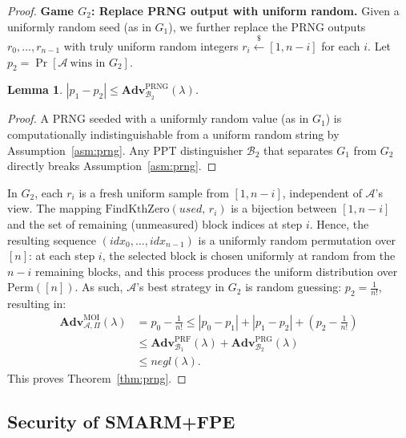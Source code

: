 \documentclass[journal]{IEEEtran}
\newcommand{\rtsmarmtwo}{SMARM+FPE\xspace}
\newtheorem{lemma}{Lemma}[section]
\newcommand{\Adv}{\mathbf{Adv}}
\begin{document}
\begin{proof}
\medskip
\noindent\textbf{Game $G_2$: Replace PRNG output with uniform random.}
Given a uniformly random seed (as in $G_1$), we further replace the PRNG
outputs $r_0,\dots,r_{n-1}$ with truly uniform random integers
$r_i \xleftarrow{\$} [1, n-i]$ for each $i$.
Let $p_2 = \Pr[\mathcal{A}\ \text{wins in } G_2]$.
 
\begin{lemma}
\label{lem:g1-g2}
$|p_1 - p_2| \leq \Adv^{\mathrm{PRNG}}_{\mathcal{B}_2}(\lambda)$.
\end{lemma}
\begin{proof}
A PRNG seeded with a uniformly random value (as in $G_1$) is computationally indistinguishable from a uniform random string by Assumption~\ref{asm:prng}.
Any PPT distinguisher $\mathcal{B}_2$ that separates $G_1$ from $G_2$
directly breaks Assumption~\ref{asm:prng}.
\end{proof}
 
In $G_2$, each $r_i$ is a fresh uniform sample from $[1, n-i]$,
independent of $\mathcal{A}$'s view.
The mapping $\mathrm{FindKthZero}(\mathit{used},\, r_i)$ is a bijection
between $[1, n-i]$ and the set of remaining (unmeasured) block indices at
step $i$.
Hence, the resulting sequence
$(\mathit{idx}_0,\dots,\mathit{idx}_{n-1})$ is a uniformly random
permutation over $[n]$: at each step $i$, the selected block is chosen
uniformly at random from the $n - i$ remaining blocks, and this process
produces the uniform distribution over $\mathrm{Perm}([n])$.
As such, $\mathcal{A}$'s best strategy in $G_2$ is random guessing:
$p_2 = \frac{1}{n!}$, resulting in:
\[
\begin{aligned}
  \Adv^{\mathrm{MOI}}_{\mathcal{A},\Pi}(\lambda)
  &= p_0 - \tfrac{1}{n!}
  \leq |p_0 - p_1| + |p_1 - p_2| + (p_2 - \tfrac{1}{n!})\\
  &\leq \Adv^{\mathrm{PRF}}_{\mathcal{B}_1}(\lambda)
       + \Adv^{\mathrm{PRG}}_{\mathcal{B}_2}(\lambda)\\
  &\leq \mathit{negl}(\lambda).
\end{aligned}
\]
This proves Theorem~\ref{thm:prng}.
 
\end{proof}
 
\subsection{Security of \rtsmarmtwo}
\label{sec:proof-fpe}
 
\end{document}
